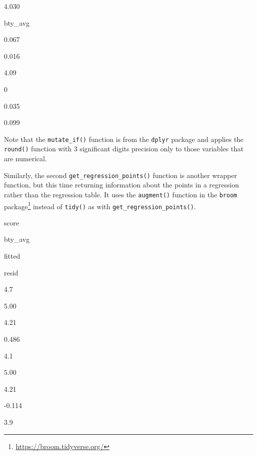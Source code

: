 \documentclass[12pt,]{krantz}
\makeatletter
\newenvironment{Shaded}{\begin{snugshade}}{\end{snugshade}}
\newcommand{\KeywordTok}[1]{\textcolor[rgb]{0.27,0.27,0.27}{\textbf{#1}}}
\newcommand{\DataTypeTok}[1]{\textcolor[rgb]{0.27,0.27,0.27}{#1}}
\newcommand{\DecValTok}[1]{\textcolor[rgb]{0.06,0.06,0.06}{#1}}
\newcommand{\StringTok}[1]{\textcolor[rgb]{0.5,0.5,0.5}{#1}}
\newcommand{\OperatorTok}[1]{\textcolor[rgb]{0.43,0.43,0.43}{\textbf{#1}}}
\newcommand{\NormalTok}[1]{#1}
\renewcommand{\href}[2]{#2\footnote{\url{#1}}}
\newenvironment{kframe}{%
\medskip{}
\setlength{\fboxsep}{.8em}
 \def\at@end@of@kframe{}%
 \ifinner\ifhmode%
  \def\at@end@of@kframe{\end{minipage}}%
  \begin{minipage}{\columnwidth}%
 \fi\fi%
 \def\FrameCommand##1{\hskip\@totalleftmargin \hskip-\fboxsep
 \colorbox{shadecolor}{##1}\hskip-\fboxsep
     \hskip-\linewidth \hskip-\@totalleftmargin \hskip\columnwidth}%
 \MakeFramed {\advance\hsize-\width
   \@totalleftmargin\z@ \linewidth\hsize
   \@setminipage}}%
 {\par\unskip\endMakeFramed%
 \at@end@of@kframe}
\renewenvironment{Shaded}{\begin{kframe}}{\end{kframe}}
\makeatother
\begin{document}
4.030

bty\_avg

0.067

0.016

4.09

0

0.035

0.099

Note that the \texttt{mutate\_if()} function is from the \texttt{dplyr}
package and applies the \texttt{round()} function with 3 significant
digits precision only to those variables that are numerical.

Similarly, the second \texttt{get\_regression\_points()} function is
another wrapper function, but this time returning information about the
points in a regression rather than the regression table. It uses the
\texttt{augment()} function in the
\href{https://broom.tidyverse.org/}{\texttt{broom} package} instead of
\texttt{tidy()} as with \texttt{get\_regression\_points()}.

\begin{Shaded}
\end{Shaded}

score

bty\_avg

fitted

resid

4.7

5.00

4.21

0.486

4.1

5.00

4.21

-0.114

3.9
\end{document}
